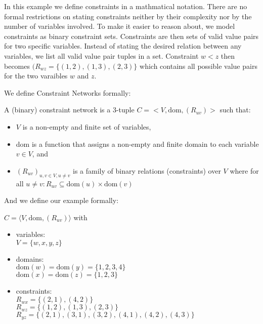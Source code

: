 In this example we define constraints in a mathmatical notation. There are no formal restrictions on stating constraints neither by their complexity nor by the number of variables involved. To make it easier to reason about, we model constraints as binary constraint sets. Constraints are then sets of valid value pairs for two specific variables. Instead of stating the desired relation between any variables, we list all valid value pair tuples in a set. Constraint $w < z$ then becomes $(R_{wz} = \{(1, 2), (1, 3), (2, 3)\}$ which contains all possible value pairs for the two varaibles $w$ and $z$.

We define Constraint Networks formally:

\begin{tcolorbox}
	A (binary) constraint network is a 3-tuple $C = <V, \text{dom}, (R_{uv})>$ such that:
	\begin{itemize}
		\item $V$ is a non-empty and finite set of variables,
		\item dom is a function that assigns a non-empty and finite domain to each variable $v \in V$, and
		\item $(R_{uv})_{u,v \in V, u \neq v}$ is a family of binary relations (constraints) over $V$ where for all $u \neq v: R_{uv} \subseteq \text{dom}(u) \times \text{dom}(v)$
	\end{itemize}
\end{tcolorbox}

And we define our example formally:

\begin{tcolorbox}
	$C = \langle V, \text{dom}, (R_{uv})\rangle$ with
	\begin{itemize}
		\item variables: \\
		      $V = \{w, x, y, z\}$
		\item domains: \\
		      $\text{dom}(w) = \text{dom}(y) = \{1, 2, 3, 4\}$ \\
		      $\text{dom}(x) = \text{dom}(z) = \{1, 2, 3\}$
		\item constraints: \\
		      $R_{wx} = \{(2, 1), (4, 2)\}$ \\
		      $R_{wz} = \{(1, 2), (1, 3), (2, 3)\}$ \\
		      $R_{yz} = \{(2, 1), (3, 1), (3, 2), (4, 1), (4, 2), (4, 3)\}$ \\
	\end{itemize}
\end{tcolorbox}

